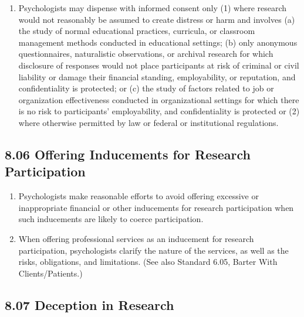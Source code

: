\begin{enumerate}


\item Psychologists may dispense with informed consent only (1) where research would not reasonably be assumed
to create distress or harm and involves (a) the study of normal educational practices, curricula, or classroom management methods conducted in educational settings; (b) only anonymous questionnaires, naturalistic observations, or archival research for which disclosure of responses would not place participants at risk of criminal or civil liability or damage their financial standing, employability, or reputation, and confidentiality is protected; or (c) the study of factors related to job or organization effectiveness conducted in organizational settings for which there is no risk to participants' employability, and confidentiality is protected or (2) where otherwise permitted by law or federal or institutional regulations.



\end{enumerate}




\subsection{8.06 Offering Inducements for Research Participation}




\begin{enumerate}


\item Psychologists make reasonable efforts to avoid offering excessive or inappropriate financial or other inducements for research participation when such inducements are likely to coerce participation.




\item When offering professional services as an inducement for research participation, psychologists clarify the nature of the services, as well as the risks, obligations, and limitations. (See also Standard 6.05, Barter With Clients/Patients.)


\end{enumerate}



\subsection{8.07 Deception in Research}


